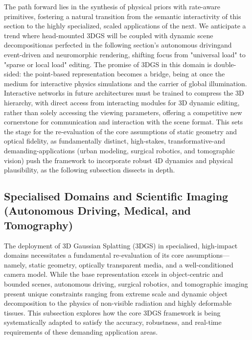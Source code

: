 \documentclass[11pt,a4paper]{article}
\begin{document}
The path forward lies in the synthesis of physical priors with rate-aware primitives, fostering a natural transition from the semantic interactivity of this section to the highly specialized, scaled applications of the next. We anticipate a trend where head-mounted 3DGS will be coupled with dynamic scene decompositionas perfected in the following section's autonomous drivingand event-driven and neuromorphic rendering, shifting focus from "universal load" to "sparse or local load" editing. The promise of 3DGS in this domain is double-sided: the point-based representation becomes a bridge, being at once the medium for interactive physics simulations and the carrier of global illumination. Interactive networks in future architectures must be trained to compress the 3D hierarchy, with direct access from interacting modules for 3D dynamic editing, rather than solely accessing the viewing parameters, offering a competitive new cornerstone for communication and interaction with the scene format. This sets the stage for the re-evaluation of the core assumptions of static geometry and optical fidelity, as fundamentally distinct, high-stakes, transformative-and demanding-applications (urban modeling, surgical robotics, and tomographic vision) push the framework to incorporate robust 4D dynamics and physical plausibility, as the following subsection dissects in depth.


\subsection{Specialised Domains and Scientific Imaging (Autonomous Driving, Medical, and Tomography)}


The deployment of 3D Gaussian Splatting (3DGS) in specialised, high-impact domains necessitates a fundamental re-evaluation of its core assumptions---namely, static geometry, optically transparent media, and a well-conditioned camera model. While the base representation excels in object-centric and bounded scenes, autonomous driving, surgical robotics, and tomographic imaging present unique constraints ranging from extreme scale and dynamic object decomposition to the physics of non-visible radiation and highly deformable tissues. This subsection explores how the core 3DGS framework is being systematically adapted to satisfy the accuracy, robustness, and real-time requirements of these demanding application areas.
\end{document}
